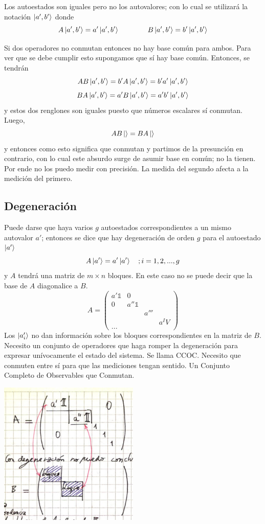 \documentclass[10pt,oneside]{CBFT_book}
\begin{document}
Los autoestados son iguales pero no los autovalores; con lo cual se utilizará la notación $\Ket{a',b'}$ donde 
\[
	A \Ket{a',b'} = a' \Ket{a',b'} \qquad \qquad B \Ket{a',b'} = b' \Ket{a',b'}
\]

Si dos operadores no conmutan entonces no hay base común para ambos.
Para ver que se debe cumplir esto supongamos que sí hay base común.
Entonces, se tendrán
\[
	AB \Ket{a',b'} = b' A \Ket{a',b'} =  b' a' \Ket{a',b'}
\]
\[
	BA \Ket{a',b'} = a' B \Ket{a',b'} =  a' b' \Ket{a',b'}
\]
y estos dos renglones son iguales puesto que números escalares sí conmutan.
Luego,
\[
	AB \Ket{} = BA \Ket{}
\]
y entonces como esto significa que conmutan y partimos de la presunción en contrario,
con lo cual este absurdo surge de asumir base en común; no la tienen.
Por ende no los puedo medir con precisión. La medida del segundo afecta a la medición del primero.

\subsection{Degeneración}

Puede darse que haya varios $g$ autoestados correspondientes a un mismo autovalor $a'$; 
entonces se dice que hay degeneración de orden $g$ para el autoestado $\Ket{a'}$
\[
	A\Ket{a'}= a'\Ket{a'} \quad ; i=1,2,...,g
\]
y $A$ tendrá una matriz de $m\times n$ bloques. 
En este caso no se puede decir que la base de $A$ diagonalice a $B$.
\[
	A = \begin{pmatrix}
	     a'\mathbb{1} & 0 & & \\
	     0 & a''\mathbb{1} & & \\
	     & & a'''& \\
	     & & & a^IV \\
	     ...
	    \end{pmatrix}
\]
Los $\ket{a'_i}$ no dan información sobre los bloques correspondientes en la matriz de $B$.
Necesito un conjunto de operadores que haga romper la degeneración para expresar unívocamente 
el estado del sistema. Se llama CCOC. Necesito que conmuten entre sí para que las mediciones tengan sentido.
Un Conjunto Completo de Observables que Conmutan.

\includegraphics[width=0.5\textwidth]{images/fig_ft2_matriz_degenerada1.jpg}
\end{document}
